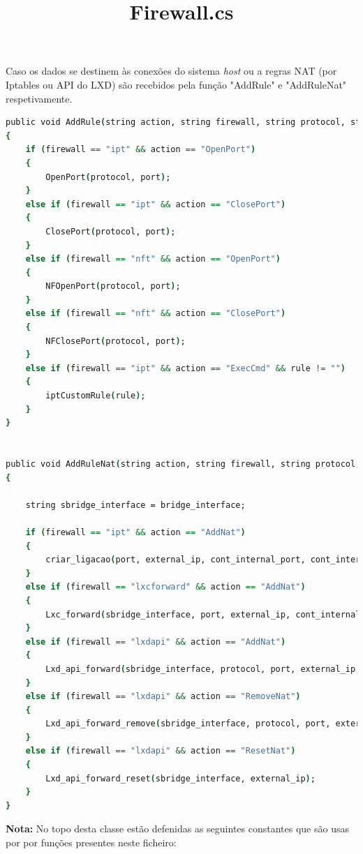 \title*{\textbf{Firewall.cs}}

Caso os dados se destinem às conexões do sistema \textit{host} ou a regras NAT (por Iptables 
ou API do LXD) são recebidos pela função "AddRule" e "AddRuleNat" respetivamente.




\begin{lstlisting}[language=csh, caption={Funções de firewall.cs}]
public void AddRule(string action, string firewall, string protocol, string port, string rule = "")
{
    if (firewall == "ipt" && action == "OpenPort")
    {
        OpenPort(protocol, port);
    }
    else if (firewall == "ipt" && action == "ClosePort")
    {
        ClosePort(protocol, port);
    }
    else if (firewall == "nft" && action == "OpenPort")
    {
        NFOpenPort(protocol, port);
    }
    else if (firewall == "nft" && action == "ClosePort")
    {
        NFClosePort(protocol, port);
    }
    else if (firewall == "ipt" && action == "ExecCmd" && rule != "")
    {
        iptCustomRule(rule);
    }
}


public void AddRuleNat(string action, string firewall, string protocol, string port, string external_ip, string cont_internal_ip, string cont_internal_port, string rule = "")
{

    string sbridge_interface = bridge_interface;

    if (firewall == "ipt" && action == "AddNat")
    {
        criar_ligacao(port, external_ip, cont_internal_port, cont_internal_ip, protocol);
    }
    else if (firewall == "lxcforward" && action == "AddNat")
    {
        Lxc_forward(sbridge_interface, port, external_ip, cont_internal_port, cont_internal_ip, protocol);
    }
    else if (firewall == "lxdapi" && action == "AddNat")
    {
        Lxd_api_forward(sbridge_interface, protocol, port, external_ip, cont_internal_ip, cont_internal_port);
    }
    else if (firewall == "lxdapi" && action == "RemoveNat")
    {
        Lxd_api_forward_remove(sbridge_interface, protocol, port, external_ip, cont_internal_ip, cont_internal_port);
    }
    else if (firewall == "lxdapi" && action == "ResetNat")
    {
        Lxd_api_forward_reset(sbridge_interface, external_ip);
    }
}

\end{lstlisting} 



\textbf{Nota:} No topo desta classe estão defenidas as seguintes constantes que são usas por
por funções presentes neste ficheiro:

